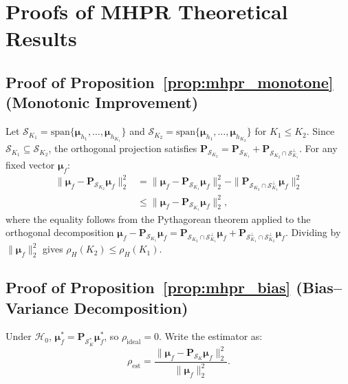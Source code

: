 \documentclass[journal]{IEEEtran}
\theoremstyle{definition}
\begin{document}
\appendices
\section{Proofs of MHPR Theoretical Results}
\label{app:mhpr_proofs}

\subsection{Proof of Proposition~\ref{prop:mhpr_monotone} (Monotonic Improvement)}

Let $\mathcal{S}_{K_1} = \mathrm{span}\{\boldsymbol{\mu}_{h_1},\dots,\boldsymbol{\mu}_{h_{K_1}}\}$ and $\mathcal{S}_{K_2} = \mathrm{span}\{\boldsymbol{\mu}_{h_1},\dots,\boldsymbol{\mu}_{h_{K_2}}\}$ for $K_1 \le K_2$. Since $\mathcal{S}_{K_1} \subseteq \mathcal{S}_{K_2}$, the orthogonal projection satisfies $\mathbf{P}_{\mathcal{S}_{K_2}} = \mathbf{P}_{\mathcal{S}_{K_1}} + \mathbf{P}_{\mathcal{S}_{K_2} \cap \mathcal{S}_{K_1}^\perp}$. For any fixed vector $\boldsymbol{\mu}_f$:
\begin{align}
\|\boldsymbol{\mu}_f - \mathbf{P}_{\mathcal{S}_{K_2}}\boldsymbol{\mu}_f\|_2^2 &= \|\boldsymbol{\mu}_f - \mathbf{P}_{\mathcal{S}_{K_1}}\boldsymbol{\mu}_f\|_2^2 - \|\mathbf{P}_{\mathcal{S}_{K_2} \cap \mathcal{S}_{K_1}^\perp}\boldsymbol{\mu}_f\|_2^2 \nonumber\\
&\le \|\boldsymbol{\mu}_f - \mathbf{P}_{\mathcal{S}_{K_1}}\boldsymbol{\mu}_f\|_2^2,
\end{align}
where the equality follows from the Pythagorean theorem applied to the orthogonal decomposition $\boldsymbol{\mu}_f - \mathbf{P}_{\mathcal{S}_{K_1}}\boldsymbol{\mu}_f = \mathbf{P}_{\mathcal{S}_{K_2} \cap \mathcal{S}_{K_1}^\perp}\boldsymbol{\mu}_f + \mathbf{P}_{\mathcal{S}_{K_1}^\perp \cap \mathcal{S}_{K_2}^\perp}\boldsymbol{\mu}_f$. Dividing by $\|\boldsymbol{\mu}_f\|_2^2$ gives $\rho_H(K_2) \le \rho_H(K_1)$.

\subsection{Proof of Proposition~\ref{prop:mhpr_bias} (Bias--Variance Decomposition)}

Under $\mathcal{H}_0$, $\boldsymbol{\mu}_f^* = \mathbf{P}_{\mathcal{S}_K^*}\boldsymbol{\mu}_f^*$, so $\rho_{\mathrm{ideal}} = 0$. Write the estimator as:
\begin{equation}
\rho_{\mathrm{est}} = \frac{\|\boldsymbol{\mu}_f - \mathbf{P}_{\mathcal{S}_K}\boldsymbol{\mu}_f\|_2^2}{\|\boldsymbol{\mu}_f\|_2^2}.
\end{equation}
\end{document}
